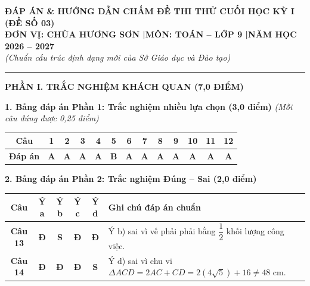 \documentclass[11pt,a4paper]{article}
\begin{document}
\begin{center}
{\large\bfseries ĐÁP ÁN \& HƯỚNG DẪN CHẤM ĐỀ THI THỬ CUỐI HỌC KỲ I (ĐỀ SỐ 03)}\\[1.5mm]
{\bfseries ĐƠN VỊ: CHÙA HƯƠNG SƠN \quad|\quad MÔN: TOÁN -- LỚP 9 \quad|\quad NĂM HỌC 2026 -- 2027}\\[1mm]
\textit{(Chuẩn cấu trúc định dạng mới của Sở Giáo dục và Đào tạo)}
\end{center}

\vspace{1mm}
\hrule
\vspace{3mm}

\noindent
\textbf{\large PHẦN I. TRẮC NGHIỆM KHÁCH QUAN (7,0 ĐIỂM)}

\vspace{2mm}
\noindent
\textbf{1. Bảng đáp án Phần 1: Trắc nghiệm nhiều lựa chọn (3,0 điểm)} \textit{(Mỗi câu đúng được 0,25 điểm)}
\begin{center}
\begin{tabular}{|c|c|c|c|c|c|c|c|c|c|c|c|c|}
\hline
\textbf{Câu} & \textbf{1} & \textbf{2} & \textbf{3} & \textbf{4} & \textbf{5} & \textbf{6} & \textbf{7} & \textbf{8} & \textbf{9} & \textbf{10} & \textbf{11} & \textbf{12} \\
\hline
\textbf{Đáp án} & \textbf{A} & \textbf{A} & \textbf{A} & \textbf{A} & \textbf{B} & \textbf{A} & \textbf{A} & \textbf{A} & \textbf{A} & \textbf{A} & \textbf{A} & \textbf{A} \\
\hline
\end{tabular}
\end{center}

\vspace{2mm}
\noindent
\textbf{2. Bảng đáp án Phần 2: Trắc nghiệm Đúng -- Sai (2,0 điểm)}
\begin{center}
\begin{tabular}{|c|c|c|c|c|l|}
\hline
\textbf{Câu} & \textbf{Ý a} & \textbf{Ý b} & \textbf{Ý c} & \textbf{Ý d} & \textbf{Ghi chú đáp án chuẩn} \\
\hline
\textbf{Câu 13} & \textbf{Đ} & \textbf{S} & \textbf{Đ} & \textbf{Đ} & Ý b) sai vì vế phải phải bằng $\dfrac{1}{2}$ khối lượng công việc. \\
\hline
\textbf{Câu 14} & \textbf{Đ} & \textbf{Đ} & \textbf{Đ} & \textbf{S} & Ý d) sai vì chu vi $\Delta ACD = 2AC + CD = 2(4\sqrt{5}) + 16 \ne 48\text{ cm}$. \\
\hline
\end{tabular}
\end{center}
\end{document}
